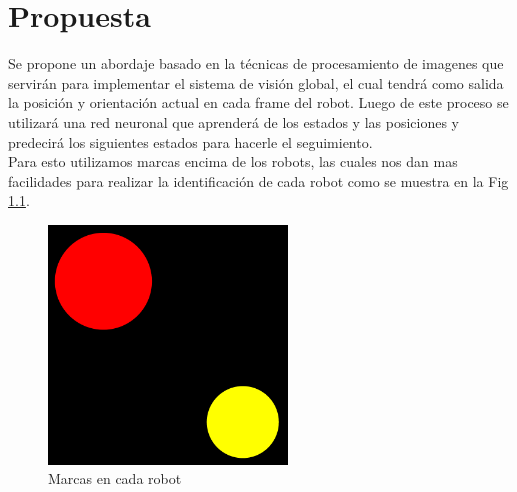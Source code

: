 
\chapter{Propuesta}
Se propone un abordaje basado en la t\'ecnicas de procesamiento de imagenes que servir\'an para implementar el sistema de visi\'on global, el cual tendr\'a como salida la posici\'on y orientaci\'on actual en cada frame del robot. Luego de este proceso se utilizar\'a una red neuronal  que aprender\'a de los estados y las posiciones y predecir\'a los siguientes estados para hacerle el seguimiento.\\
Para esto utilizamos marcas encima de los robots, las cuales nos dan mas facilidades para realizar la identificaci\'on de cada robot como se muestra en la Fig \ref{fig_mar}.
	\begin{figure}
	\centering
	\includegraphics[width=2.5in]{imagen1.pdf}
	
	\caption{Marcas en cada robot}
	\label{fig_mar}
\end{figure}
